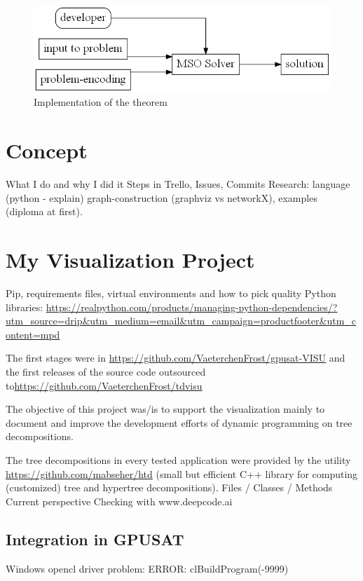 \documentclass[a4paper, 12pt]{scrartcl}
\begin{document}
\begin{figure}[H]
	\includegraphics[height=0.2\textheight]{images/UsageCourcelle.gv.png}
	\caption{Implementation of the theorem}
	\label{fig:UsageCourcelle}
\end{figure}

\newpage
\section{Concept}
What I do and why I did it
Steps in Trello, Issues, Commits
Research: language (python - explain) graph-construction (graphviz vs networkX), examples (diploma at first). 
\newpage
\section{My Visualization Project}

Pip, requirements files, virtual environments and how to pick quality Python libraries:
\url{https://realpython.com/products/managing-python-dependencies/?utm_source=drip&utm_medium=email&utm_campaign=productfooter&utm_content=mpd}


The first stages were in \url{https://github.com/VaeterchenFrost/gpusat-VISU} and the first releases of the source code outsourced to\url{https://github.com/VaeterchenFrost/tdvisu}

The objective of this project was/is to support the visualization mainly to document and improve the development efforts of dynamic programming on tree decompositions.

The tree decompositions in every tested application were provided by the utility \url{https://github.com/mabseher/htd} (small but efficient C++ library for computing (customized) tree and hypertree decompositions).
Files / Classes / Methods
Current 
perspective 
Checking with www.deepcode.ai

\newpage
\subsection{Integration in GPUSAT}
Windows opencl driver problem: ERROR: clBuildProgram(-9999)
\end{document}
